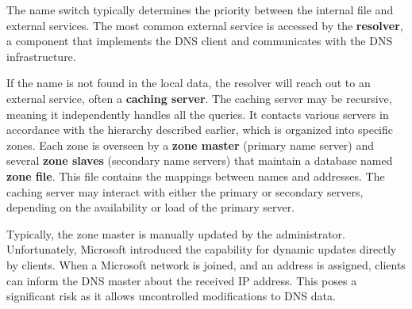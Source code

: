 The name switch typically determines the priority between the internal file and external services. The most common external service is accessed by the \textbf{resolver}, a component that implements the DNS client and communicates with the DNS infrastructure.

If the name is not found in the local data, the resolver will reach out to an external service, often a \textbf{caching server}. The caching server may be recursive, meaning it independently handles all the queries. It contacts various servers in accordance with the hierarchy described earlier, which is organized into specific zones. Each zone is overseen by a \textbf{zone master} (primary name server) and several \textbf{zone slaves} (secondary name servers) that maintain a database named \textbf{zone file}. This file contains the mappings between names and addresses. The caching server may interact with either the primary or secondary servers, depending on the availability or load of the primary server.


Typically, the zone master is manually updated by the administrator. Unfortunately, Microsoft introduced the capability for dynamic updates directly by clients. When a Microsoft network is joined, and an address is assigned, clients can inform the DNS master about the received IP address. This poses a significant risk as it allows uncontrolled modifications to DNS data.

